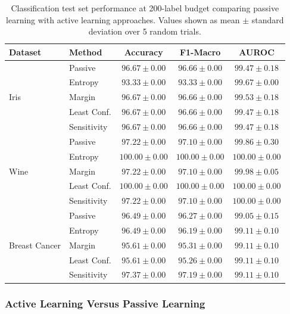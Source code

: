 \documentclass[conference]{IEEEtran}
\begin{document}
\begin{table}[t]
\centering
\caption{Classification test set performance at 200-label budget comparing passive learning with active learning approaches. Values shown as mean $\pm$ standard deviation over 5 random trials.}
\label{tab:cls-results}
\begin{tabular}{llccc}
\toprule
Dataset & Method & Accuracy & F1-Macro & AUROC \\
\midrule
\multirow{5}{*}{Iris} & Passive & $\mathbf{96.67 \pm 0.00}$ & $\mathbf{96.66 \pm 0.00}$ & $99.47 \pm 0.18$ \\
 & Entropy & $93.33 \pm 0.00$ & $93.33 \pm 0.00$ & $99.67 \pm 0.00$ \\
 & Margin & $\mathbf{96.67 \pm 0.00}$ & $\mathbf{96.66 \pm 0.00}$ & $99.53 \pm 0.18$ \\
 & Least Conf. & $\mathbf{96.67 \pm 0.00}$ & $\mathbf{96.66 \pm 0.00}$ & $99.47 \pm 0.18$ \\
 & Sensitivity & $\mathbf{96.67 \pm 0.00}$ & $\mathbf{96.66 \pm 0.00}$ & $99.47 \pm 0.18$ \\
\midrule
\multirow{5}{*}{Wine} & Passive & $97.22 \pm 0.00$ & $97.10 \pm 0.00$ & $99.86 \pm 0.30$ \\
 & Entropy & $\mathbf{100.00 \pm 0.00}$ & $\mathbf{100.00 \pm 0.00}$ & $\mathbf{100.00 \pm 0.00}$ \\
 & Margin & $97.22 \pm 0.00$ & $97.10 \pm 0.00$ & $99.98 \pm 0.05$ \\
 & Least Conf. & $\mathbf{100.00 \pm 0.00}$ & $\mathbf{100.00 \pm 0.00}$ & $\mathbf{100.00 \pm 0.00}$ \\
 & Sensitivity & $97.22 \pm 0.00$ & $97.10 \pm 0.00$ & $100.00 \pm 0.00$ \\
\midrule
\multirow{5}{*}{Breast Cancer} & Passive & $96.49 \pm 0.00$ & $96.27 \pm 0.00$ & $99.05 \pm 0.15$ \\
 & Entropy & $96.49 \pm 0.00$ & $96.19 \pm 0.00$ & $99.11 \pm 0.10$ \\
 & Margin & $95.61 \pm 0.00$ & $95.31 \pm 0.00$ & $99.11 \pm 0.10$ \\
 & Least Conf. & $95.61 \pm 0.00$ & $95.26 \pm 0.00$ & $99.11 \pm 0.10$ \\
 & Sensitivity & $\mathbf{97.37 \pm 0.00}$ & $\mathbf{97.19 \pm 0.00}$ & $\mathbf{99.11 \pm 0.10}$ \\
\bottomrule
\end{tabular}
\end{table}

\subsubsection{Active Learning Versus Passive Learning}
\end{document}
